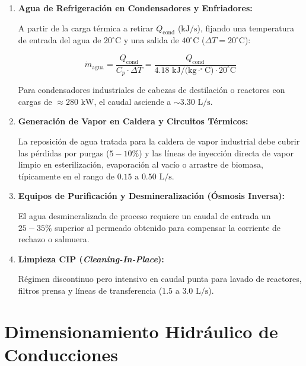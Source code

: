 \documentclass{report}
\begin{document}
\begin{enumerate}

    \item \textbf{Agua de Refrigeración en Condensadores y Enfriadores:}

          A partir de la carga térmica a retirar $Q_{\text{cond}}$ ($\text{kJ/s}$), fijando una temperatura de entrada del agua de $20^\circ\text{C}$ y una salida de $40^\circ\text{C}$ ($\Delta T = 20^\circ\text{C}$):

          \begin{equation}

              \dot{m}_{\text{agua}} = \frac{Q_{\text{cond}}}{C_p \cdot \Delta T} = \frac{Q_{\text{cond}}}{4.18\text{ kJ/(kg}\cdot^\circ\text{C)} \cdot 20^\circ\text{C}}

          \end{equation}

          Para condensadores industriales de cabezas de destilación o reactores con cargas de $\approx 280\text{ kW}$, el caudal asciende a $\sim 3.30\text{ L/s}$.

    \item \textbf{Generación de Vapor en Caldera y Circuitos Térmicos:}

          La reposición de agua tratada para la caldera de vapor industrial debe cubrir las pérdidas por purgas ($5-10\%$) y las líneas de inyección directa de vapor limpio en esterilización, evaporación al vacío o arrastre de biomasa, típicamente en el rango de $0.15\text{ a }0.50\text{ L/s}$.

    \item \textbf{Equipos de Purificación y Desmineralización (Ósmosis Inversa):}

          El agua desmineralizada de proceso requiere un caudal de entrada un $25-35\%$ superior al permeado obtenido para compensar la corriente de rechazo o salmuera.

    \item \textbf{Limpieza CIP (\textit{Cleaning-In-Place}):}

          Régimen discontinuo pero intensivo en caudal punta para lavado de reactores, filtros prensa y líneas de transferencia ($1.5\text{ a }3.0\text{ L/s}$).

\end{enumerate}



\section{Dimensionamiento Hidráulico de Conducciones}
\end{document}
